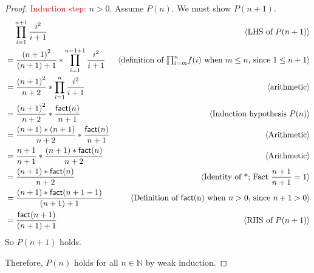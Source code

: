 \documentclass[11pt,fleqn]{article}
\newcommand{\mname}[1]{\mbox{\sf #1}}
\newcommand{\pnote}[1]{{\langle \text{#1} \rangle}}
\begin{document}
\begin{enumerate}
\begin{proof}
\textcolor{red}{Induction step}: $n > 0$. Assume $P(n)$. We must show $P(n + 1)$.
\begin{align*}
  &\phantom{{}=} \prod_{i = 1}^{n+1} \frac{i^2}{i + 1}   & \pnote{LHS of $P(n + 1)$}\\
  &= \frac{{(n+1)}^2}{(n+1)+1}* \prod_{i = 1}^{n-1+1} \frac{i^2}{i + 1}  & \pnote{definition of $\textstyle{\prod}_{i=m}^{n} f(i)$ when $m \le n$, since $1 \le n+1$}\\
  &= \frac{{(n+1)}^2}{n+2}* \prod_{i = 1}^{n} \frac{i^2}{i + 1}  & \pnote{arithmetic}\\
  &= \frac{{(n+1)}^2}{n+2}* \frac{\mname{fact}(n)}{n + 1}  & \pnote{Induction hypothesis $P(n)$}\\
  &= \frac{(n+1)*(n+1)}{n+2}* \frac{\mname{fact}(n)}{n + 1}  & \pnote{Arithmetic}\\
  &= \frac{n+1}{n+1}* \frac{(n+1)*\mname{fact}(n)}{n + 2}  & \pnote{Arithmetic}\\
  &= \frac{(n+1)*\mname{fact}(n)}{n + 2}  & \pnote{Identity of *; Fact $\frac{n+1}{n+1} = 1$}\\
  &= \frac{(n+1)*\mname{fact}(n+1-1)}{(n+1)+1}  & \pnote{Definition of \mname{fact}(n) when $n > 0$, since $n + 1 > 0$}\\
  &= \frac{\mname{fact}(n+1)}{(n+1)+1}  & \pnote{RHS of $P(n + 1)$}\\
\end{align*}
So $P(n + 1)$ holds.

\medskip

Therefore, $P(n)$ holds for all $n \in \mathbb{N}$ by weak induction.
\end{proof}

\end{enumerate}
\end{document}
